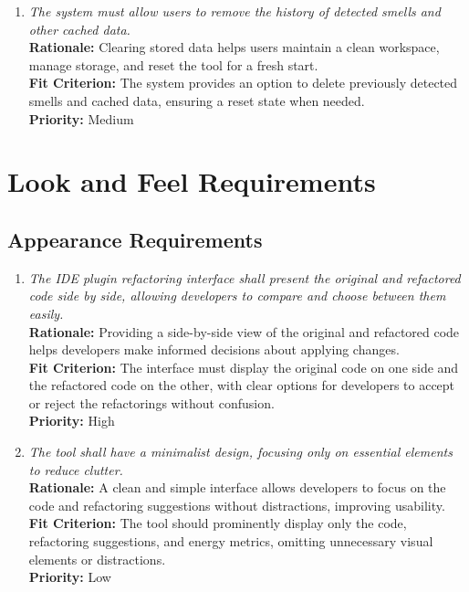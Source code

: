 \documentclass[12pt]{article}
\begin{document}
\begin{enumerate}[label=FR \arabic*., wide=0pt, leftmargin=*]
  \item \emph{The system must allow users to remove the history of
    detected smells and other cached data.}\\[2mm]
    {\bf Rationale:} Clearing stored data helps users maintain a
    clean workspace, manage storage, and reset the tool for a fresh start.\\
    {\bf Fit Criterion:} The system provides an option to delete
    previously detected smells and cached data, ensuring a reset
    state when needed.\\
    {\bf Priority:} Medium

\end{enumerate}

\section{Look and Feel Requirements}
\subsection{Appearance Requirements}
\begin{enumerate}[label=LFR-AP \arabic*., wide=0pt, leftmargin=*]
  \item \emph{The IDE plugin refactoring interface shall present the
      original and refactored code side by side, allowing developers to
    compare and choose between them easily.}\\[2mm]
    {\bf Rationale:} Providing a side-by-side view of the original
    and refactored code helps developers make informed decisions
    about applying changes.\\
    {\bf Fit Criterion:} The interface must display the original code
    on one side and the refactored code on the other, with clear
    options for developers to accept or reject the refactorings
    without confusion.\\
    {\bf Priority:} High
  \item \emph{The tool shall have a minimalist design, focusing only
    on essential elements to reduce clutter.}\\[2mm]
    {\bf Rationale:} A clean and simple interface allows developers
    to focus on the code and refactoring suggestions without
    distractions, improving usability.\\
    {\bf Fit Criterion:} The tool should prominently display only the
    code, refactoring suggestions, and energy metrics, omitting
    unnecessary visual elements or distractions.\\
    {\bf Priority:} Low
\end{enumerate}
\end{document}
